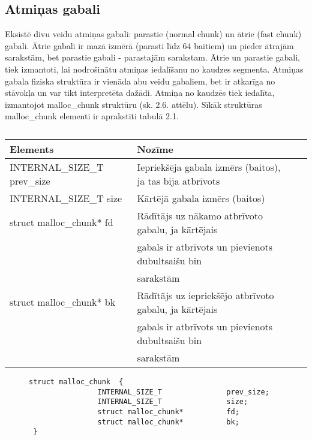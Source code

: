 \subsection{Atmiņas gabali}
\label{subsec:atminas_gabali}


Eksistē divu veidu atmiņas gabali: parastie (normal chunk) un ātrie (fast chunk) gabali. 
Ātrie gabali ir mazā izmērā (parasti līdz 64 baitiem) un pieder ātrajām sarakstām, bet parastie gabali - parastajām sarakstam. 
Ātrie un parastie gabali, tiek izmantoti, lai nodrošinātu atmiņas iedalīšanu no kaudzes segmenta.
Atmiņas gabala fiziska struktūra ir vienāda abu veidu gabaliem, bet ir atkarīga no stāvokļa un var tikt interpretēta dažādi.
Atmiņa no kaudzēs tiek iedalīta, izmantojot malloc\_chunk struktūru (sk. 2.6. attēlu). 
Sīkāk struktūras malloc\_chunk elementi ir aprakstīti tabulā 2.1.

\begin{table}[H]
\caption{\textbf{\fontsize{11}{12}\selectfont {\\ Atmiņās gabalu struktūras elementu apraksts}}} 
\label{table:kysymys}
\centering
	\begin{tabular}{|l|l|r|p{5cm}|}
	  \hline
	Elements & Nozīme \\
	\hline
	  INTERNAL\_SIZE\_T               prev\_size & Iepriekšēja gabala izmērs (baitos), ja tas bija atbrīvots\\
      \hline
      INTERNAL\_SIZE\_T               size & Kārtējā gabala izmērs (baitos) \\
      \hline
      struct malloc\_chunk*          fd & Rādītājs uz nākamo atbrīvoto gabalu, ja kārtējais  \\
                                                     & gabals ir atbrīvots un pievienots dubultsaišu bin \\
                                                     & sarakstām\\
      \hline
      struct malloc\_chunk*          bk & Rādītājs uz iepriekšējo atbrīvoto gabalu, ja kārtējais  \\
                                                     & gabals ir atbrīvots un pievienots dubultsaišu bin \\
                                                     & sarakstām\\
    \hline
	\end{tabular}
\end{table}
\begin{figure}[h]
\begin{lstlisting}
struct malloc_chunk  {
                INTERNAL_SIZE_T               prev_size;
                INTERNAL_SIZE_T               size;
                struct malloc_chunk*          fd;
                struct malloc_chunk*          bk;
 }
\end{lstlisting}
\caption{\textbf{\fontsize{11}{12}\selectfont {Atmiņas gabala struktūra}}}
\end{figure}

